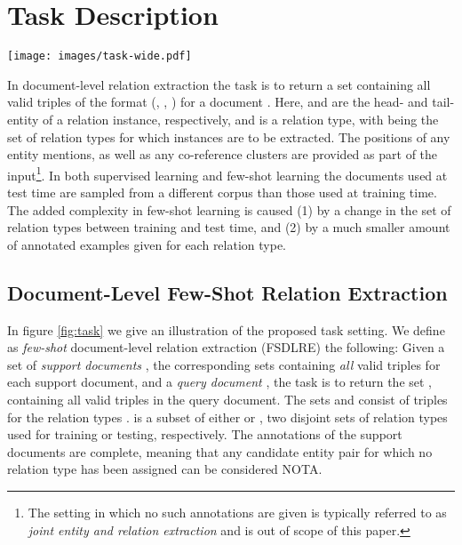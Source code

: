 \documentclass[11pt]{article}
\begin{document}
\section{Task Description}
\label{sec:task}

\begin{figure*}
\centering
    \texttt{[image: images/task-wide.pdf]}
    \caption{\label{fig:task} Illustration of an episode in the Few-Shot Document-Level Relation Extraction setting. Given a support document with annotated relation instances, the task is to return all instances of the same relation types for the query document. During testing a different corpus of documents, as well as a different set of relation types are used than during training.}
\end{figure*}

In document-level relation extraction the task is to return a set  containing all valid triples of the format (, , ) for a document .
Here,  and  are the head- and tail-entity of a relation instance, respectively, and
 is a relation type, with  being the set of relation types for which instances are to be extracted.
The positions of any entity mentions, as well as any co-reference clusters are provided as part of the input\footnote{The setting in which no such annotations are given is typically referred to as \textit{joint entity and relation extraction} and is out of scope of this paper.}.
In both supervised learning and few-shot learning the documents used at test time are sampled from a different corpus than those used at training time.
The added complexity in few-shot learning is caused (1) by a change in the set of relation types  between training and test time, and (2) by a much smaller amount of annotated examples given for each relation type.

\subsection{Document-Level Few-Shot Relation Extraction}
In figure \ref{fig:task} we give an illustration of the proposed task setting.
We define as \textit{few-shot} document-level relation extraction (FSDLRE) the following: 
Given a set of \textit{support documents} , the corresponding sets  containing \textit{all} valid triples for each support document, and a \textit{query document} , the task is to return the set , containing all valid triples in the query document.
The sets  and  consist of triples for the relation types . 
 is a subset of either  or , two disjoint sets of relation types used for training or testing, respectively.
The annotations of the support documents are complete, meaning that any candidate entity pair for which no relation type has been assigned can be considered NOTA.
\end{document}

